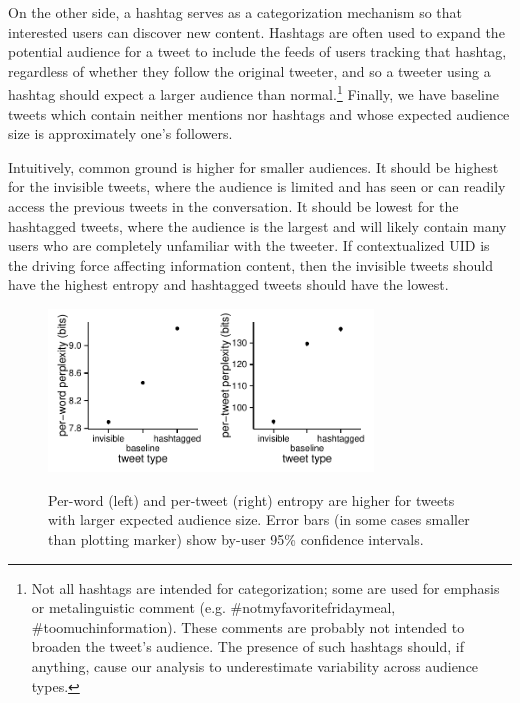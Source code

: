 \documentclass[11pt,letterpaper]{article}
\begin{document}
On the other side, a hashtag serves as a categorization mechanism so that interested users can discover new content. Hashtags are often used to expand the potential audience for a tweet to include the feeds of users tracking that hashtag, regardless of whether they follow the original tweeter, and so a tweeter using a hashtag should expect a larger audience than normal.\footnote{Not all hashtags are intended for categorization; some are used for emphasis or metalinguistic comment (e.g. \#notmyfavoritefridaymeal, \#toomuchinformation). These comments are probably not intended to broaden the tweet's audience. The presence of such hashtags should, if anything, cause our analysis to underestimate variability across audience types.}  Finally, we have baseline tweets which contain neither mentions nor hashtags and whose expected audience size is approximately one's followers.

Intuitively, common ground is higher for smaller audiences. It should be highest for the invisible tweets, where the audience is limited and has seen or can readily access the previous tweets in the conversation.  It should be lowest for the hashtagged tweets, where the audience is the largest and will likely contain many users who are completely unfamiliar with the tweeter.  If contextualized UID is the driving force affecting information content, then the invisible tweets should have the highest entropy and hashtagged tweets should have the lowest.

\begin{figure}
 \centering \includegraphics[width=1.7in]{figures/cmcl-audience-pw.pdf}\includegraphics[width=1.7in]{figures/cmcl-audience-pt.pdf}
 \caption{\label{fig:audience} Per-word (left) and per-tweet (right) entropy are higher for tweets with larger expected audience size. Error bars (in some cases smaller than plotting marker) show by-user 95\% confidence intervals.}
\vspace*{-.5em}
\end{figure}
\end{document}

